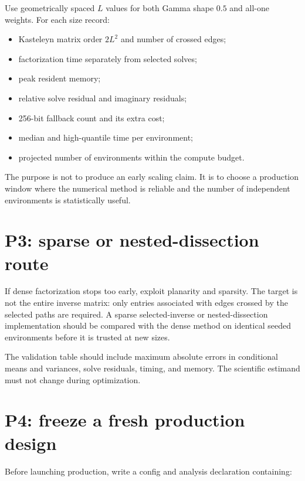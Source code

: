 \documentclass[11pt,a4paper,oneside,openany]{memoir}
\newcommand{\1}{\bm{1}}
\begin{document}
Use geometrically spaced $L$ values for both Gamma shape $0.5$ and all-one
weights. For each size record:

\begin{itemize}
  \item Kasteleyn matrix order $2L^2$ and number of crossed edges;
  \item factorization time separately from selected solves;
  \item peak resident memory;
  \item relative solve residual and imaginary residuals;
  \item 256-bit fallback count and its extra cost;
  \item median and high-quantile time per environment;
  \item projected number of environments within the compute budget.
\end{itemize}

The purpose is not to produce an early scaling claim. It is to choose a
production window where the numerical method is reliable and the number of
independent environments is statistically useful.

\section{P3: sparse or nested-dissection route}

If dense factorization stops too early, exploit planarity and sparsity. The
target is not the entire inverse matrix: only entries associated with edges
crossed by the selected paths are required. A sparse selected-inverse or
nested-dissection implementation should be compared with the dense method on
identical seeded environments before it is trusted at new sizes.

The validation table should include maximum absolute errors in conditional
means and variances, solve residuals, timing, and memory. The scientific
estimand must not change during optimization.

\section{P4: freeze a fresh production design}

Before launching production, write a config and analysis declaration containing:
\end{document}
